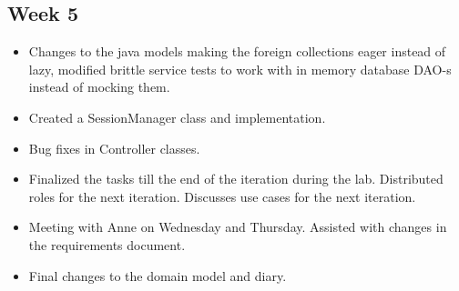 \documentclass[12pt]{article}
\begin{document}
\subsection*{Week 5}

\begin{itemize}
\item Changes to the java models making the foreign collections eager instead of lazy, modified brittle service tests to work with in memory database DAO-s instead of mocking them. 

\item Created a SessionManager class and implementation. 

\item Bug fixes in Controller classes. 

\item Finalized the tasks till the end of the iteration during the lab. Distributed roles for the next iteration. Discusses use cases for the next iteration.

\item Meeting with Anne on Wednesday and Thursday. Assisted with changes in the requirements document.

\item Final changes to the domain model and diary.

\end{itemize}
\end{document}
